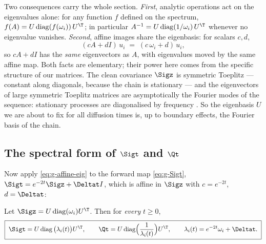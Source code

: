 Two consequences carry the whole section. \emph{First}, analytic operations
act on the eigenvalues alone: for any function $f$ defined on the spectrum,
$f(A) = U \operatorname{diag}(f(\omega_i))\, U^\T$; in particular
$A^{-1} = U \operatorname{diag}(1/\omega_i)\, U^\T$ whenever no eigenvalue
vanishes. \emph{Second}, affine images share the eigenbasis: for scalars
$c, d$,
\begin{equation}
  (c A + d I)\, u_i \;=\; (c\, \omega_i + d)\, u_i ,
  \label{eq:g-affine-eig}
\end{equation}
so $cA + dI$ has the \emph{same} eigenvectors as $A$, with eigenvalues moved
by the same affine map. Both facts are elementary; their power here comes
from the specific structure of our matrices. The clean covariance $\Sigz$
is symmetric Toeplitz --- constant along diagonals, because the chain is
stationary --- and the eigenvectors of large symmetric Toeplitz matrices
are asymptotically the Fourier modes of the sequence: stationary processes
are diagonalised by frequency \citep{brockwell1991time}. So the eigenbasis
$U$ we are about to fix for all diffusion times is, up to boundary effects,
the Fourier basis of the chain.

\subsection{The spectral form of $\Sigt$ and $\Qt$}

Now apply \eqref{eq:g-affine-eig} to the forward map
\eqref{eq:g-Sigt}, $\Sigt = e^{-2t} \Sigz + \Deltat I$, which is affine in
$\Sigz$ with $c = e^{-2t}$, $d = \Deltat$:

\begin{theorem}\label{thm:g-three-forms}
Let $\Sigz = U \operatorname{diag}(\omega_i) U^\T$. Then for \emph{every}
$t \geq 0$,
\begin{equation}
  \boxed{\;
  \Sigt = U \operatorname{diag}\big( \lambda_i(t) \big) U^\T,
  \qquad
  \Qt = U \operatorname{diag}\!\Big( \frac{1}{\lambda_i(t)} \Big) U^\T,
  \qquad
  \lambda_i(t) = e^{-2t} \omega_i + \Deltat .
  \;}
  \label{eq:g-Qt-spec}
\end{equation}
\end{theorem}

